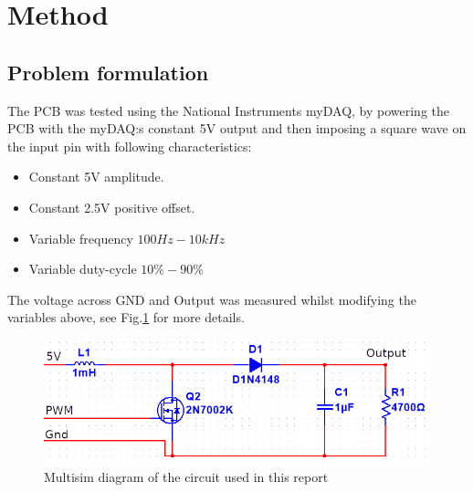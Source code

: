 \section{Method}
\subsection{Problem formulation}
The PCB was tested using the National Instruments myDAQ, by powering the PCB with the myDAQ:s constant 5V output and then imposing a square wave on the input pin with following characteristics:
\begin{itemize}
        \item Constant 5V amplitude.
        \item Constant 2.5V positive offset.
        \item Variable frequency $100Hz-10kHz$
        \item Variable duty-cycle $10\% - 90\%$
\end{itemize}
The voltage across GND and Output was measured whilst modifying the variables above, see Fig.\ref{fig:pcb} for more details.
\begin{figure}[h!]
    \includegraphics[width=\linewidth]{CircuitDesign.jpg}
    \caption{Multisim diagram of the circuit used in this report}
    \label{fig:pcb}
\end{figure}

